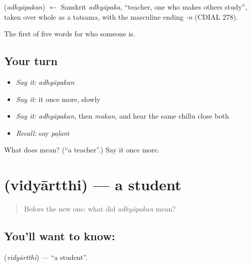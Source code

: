 \begin{cousinweb}
\textbf{} (\emph{adhyāpakan}) $\leftarrow$ Sanskrit \emph{adhyāpaka}, \textquotedblleft{}teacher, one who makes others study\textquotedblright{}, taken over whole as a tatsama, with the masculine ending \emph{-n} (CDIAL 278).
\end{cousinweb}

\begin{grammarlens}[title={What you've built}]
The first of five words for who someone is.
\end{grammarlens}

\subsection*{Your turn}
\begin{itemize}
\raggedright
  \item \emph{Say it:} \emph{adhyāpakan}
  \item \emph{Say it:} it once more, slowly
  \item \emph{Say it:} \emph{adhyāpakan}, then \emph{makan}, and hear the same chillu close both
  \item \emph{Recall:} say \emph{paḻaṁ}
\end{itemize}

\begin{tcolorbox}[breakable,colback=teal!4,colframe=teal!35!black,title={Before you move on}]
What does  mean? (\textquotedblleft{}a teacher\textquotedblright{}.) Say it once more.
\end{tcolorbox}
\section[\texorpdfstring{\ml{വിദ്യാർത്ഥി} (vidyārtthi)}{വിദ്യാർത്ഥി (vidyārtthi)}]{ (vidyārtthi) — a student}

\label{lesson:ML-C48-student}



\begin{quote}
Before the new one: what did \emph{adhyāpakan} mean?
\end{quote}

\subsection*{You'll want to know: }
\textbf{} (\emph{vidyārtthi}) — \textquotedblleft{}a student\textquotedblright{}.

